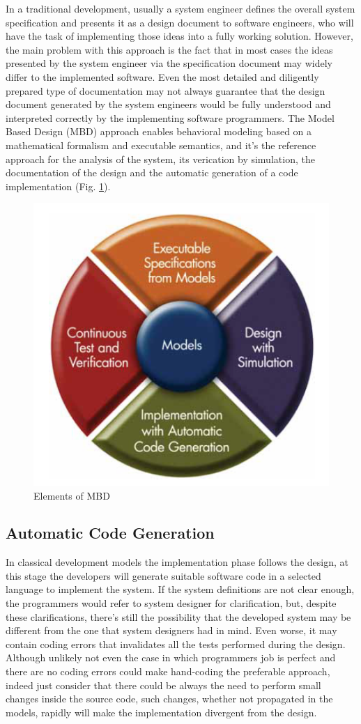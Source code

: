 In a traditional development, usually a system engineer defines the overall system specification and presents it as a design document to software engineers, who will have the task of implementing those ideas into a fully working solution. However, the main problem with this approach is the fact that in most cases the ideas presented by the system engineer via the specification document may widely differ to the implemented software. Even the most detailed and diligently prepared type of documentation may not always guarantee that the design document generated by the system engineers would be fully understood and interpreted correctly by the implementing software programmers. The Model Based Design (MBD) approach enables behavioral modeling based on a mathematical formalism and executable semantics, and it's the reference approach for the analysis of the system, its verication by simulation, the documentation of the design and the automatic generation of a code implementation (Fig. \ref{fig:elMBD}). 

\begin{figure}[!h]
	\centering 
     \includegraphics[width=.5\textwidth]{Figs/elementsMBD.PNG} 
     \caption{Elements of MBD} 
     \label{fig:elMBD} 
\end{figure} 

\subsection{Automatic Code Generation}

In classical development models the implementation phase follows the design, at this stage the developers will generate suitable software code in a selected language to implement the system. If the system definitions are not clear enough, the programmers would refer to system designer for clarification, but, despite these clarifications, there's still the possibility that the developed system may be different from the one that system designers had in mind. Even worse, it may contain coding errors that invalidates all the tests performed during the design. Although unlikely not even the case in which programmers job is perfect and there are no coding errors could make hand-coding the preferable approach, indeed just consider that there could be always the need to perform small changes inside the source code, such changes, whether not propagated in the models, rapidly will make the implementation divergent from the design. 
